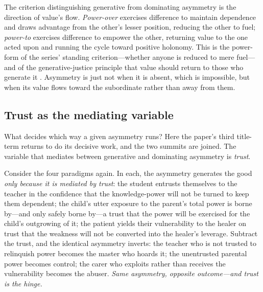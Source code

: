\begin{claim}
The criterion distinguishing generative from dominating asymmetry is the direction of value's flow. \emph{Power-over} exercises difference to maintain dependence and draws advantage from the other's lesser position, reducing the other to fuel; \emph{power-to} exercises difference to empower the other, returning value to the one acted upon and running the cycle toward positive holonomy. This is the power-form of the series' standing criterion---whether anyone is reduced to mere fuel---and of the generative-justice principle that value should return to those who generate it \parencite{eglash2016}. Asymmetry is just not when it is absent, which is impossible, but when its value flows toward the subordinate rather than away from them.
\end{claim}

\subsection{Trust as the mediating variable}
\label{p17:sub:asymmetry-trust}

What decides which way a given asymmetry runs? Here the paper's third title-term returns to do its decisive work, and the two summits are joined. The variable that mediates between generative and dominating asymmetry is \emph{trust}.

Consider the four paradigms again. In each, the asymmetry generates the good \emph{only because it is mediated by trust}: the student entrusts themselves to the teacher in the confidence that the knowledge-power will not be turned to keep them dependent; the child's utter exposure to the parent's total power is borne by---and only safely borne by---a trust that the power will be exercised for the child's outgrowing of it; the patient yields their vulnerability to the healer on trust that the weakness will not be converted into the healer's leverage. Subtract the trust, and the identical asymmetry inverts: the teacher who is not trusted to relinquish power becomes the master who hoards it; the unentrusted parental power becomes control; the carer who exploits rather than receives the vulnerability becomes the abuser. \emph{Same asymmetry, opposite outcome---and trust is the hinge.}


